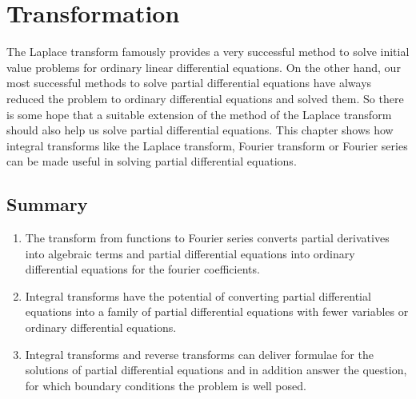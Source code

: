 %
%
%
\chapter{Transformation}
The Laplace transform famously provides a very successful method
to solve initial value problems for ordinary linear differential equations.
On the other hand, our most successful methods to solve partial differential
equations have always reduced the problem to ordinary differential
equations and solved them.
So there is some hope that a suitable extension of the method of the
Laplace transform should also help us solve partial differential
equations.
This chapter shows how integral transforms like the Laplace transform,
Fourier transform or Fourier series can be made useful in solving
partial differential equations.







\section{Summary}
\begin{enumerate}
\item
The transform from functions to Fourier series converts
partial derivatives into algebraic terms and partial differential
equations into ordinary differential equations for the
fourier coefficients.
\item
Integral transforms have the potential of converting partial differential
equations into a family of partial differential equations with fewer
variables or ordinary differential equations.
\item
Integral transforms and reverse transforms can deliver formulae for the
solutions of partial differential equations and in addition answer
the question, for which boundary conditions the problem is well posed.
\end{enumerate}
